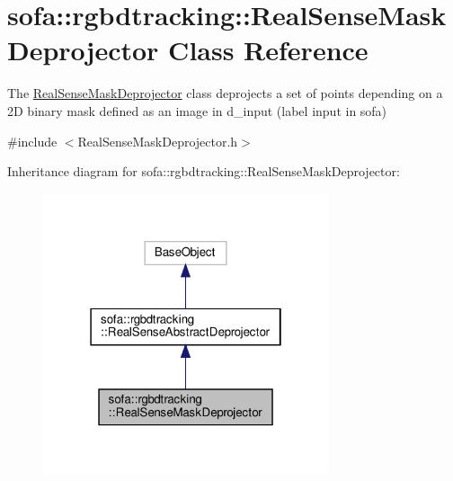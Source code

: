 \hypertarget{classsofa_1_1rgbdtracking_1_1_real_sense_mask_deprojector}{}\section{sofa\+:\+:rgbdtracking\+:\+:Real\+Sense\+Mask\+Deprojector Class Reference}
\label{classsofa_1_1rgbdtracking_1_1_real_sense_mask_deprojector}


The \hyperlink{classsofa_1_1rgbdtracking_1_1_real_sense_mask_deprojector}{Real\+Sense\+Mask\+Deprojector} class deprojects a set of points depending on a 2D binary mask defined as an image in d\+\_\+input (label input in sofa)  




{\ttfamily \#include $<$Real\+Sense\+Mask\+Deprojector.\+h$>$}



Inheritance diagram for sofa\+:\+:rgbdtracking\+:\+:Real\+Sense\+Mask\+Deprojector\+:
\nopagebreak
\begin{figure}[H]
\begin{center}
\leavevmode
\includegraphics[width=238pt]{classsofa_1_1rgbdtracking_1_1_real_sense_mask_deprojector__inherit__graph}
\end{center}
\end{figure}


